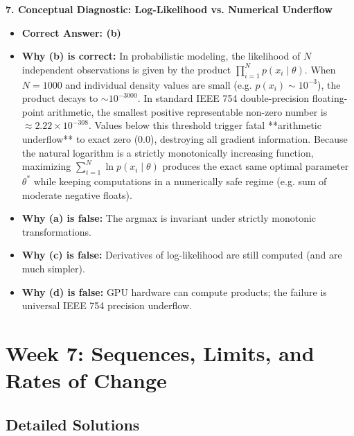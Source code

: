 \textbf{7. Conceptual Diagnostic: Log-Likelihood vs. Numerical Underflow}
\begin{itemize}
    \item \textbf{Correct Answer: (b)}
    \item \textbf{Why (b) is correct:} In probabilistic modeling, the likelihood of $N$ independent observations is given by the product $\prod_{i=1}^N p(x_i \mid \theta)$. When $N = 1000$ and individual density values are small (e.g. $p(x_i) \sim 10^{-3}$), the product decays to $\sim 10^{-3000}$. In standard IEEE 754 double-precision floating-point arithmetic, the smallest positive representable non-zero number is $\approx 2.22 \times 10^{-308}$. Values below this threshold trigger fatal **arithmetic underflow** to exact zero ($0.0$), destroying all gradient information. Because the natural logarithm is a strictly monotonically increasing function, maximizing $\sum_{i=1}^N \ln p(x_i \mid \theta)$ produces the exact same optimal parameter $\theta^*$ while keeping computations in a numerically safe regime (e.g. sum of moderate negative floats).
    \item \textbf{Why (a) is false:} The argmax is invariant under strictly monotonic transformations.
    \item \textbf{Why (c) is false:} Derivatives of log-likelihood are still computed (and are much simpler).
    \item \textbf{Why (d) is false:} GPU hardware can compute products; the failure is universal IEEE 754 precision underflow.
\end{itemize}

\section*{Week 7: Sequences, Limits, and Rates of Change}

\subsection*{Detailed Solutions}

